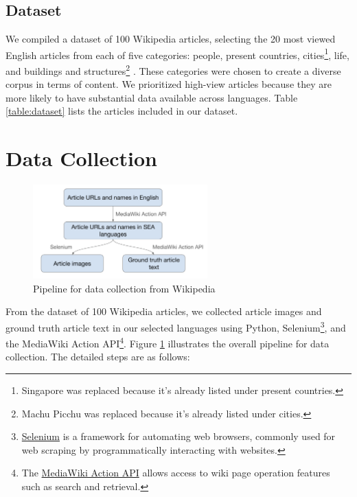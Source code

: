 \documentclass[12pt,oneside]{memoir}
\begin{document}
\subsection{Dataset}
We compiled a dataset of 100 Wikipedia articles, selecting the 20 most viewed English articles 
from each of five categories: people, present countries, cities\footnote{Singapore was replaced 
because it's already listed under present countries.}, life, and buildings and structures\footnote{Machu 
Picchu was replaced because it's already listed under cities.} 
\parencite{wikipedia-popular-pages-2024}.
These categories were chosen to create a diverse corpus in terms of content. 
We prioritized high-view articles because they are more likely to have substantial data available across languages. 
Table \ref{table:dataset} lists the articles included in our dataset.

\section{Data Collection}

\begin{figure}[ht]
    \centering
    \includegraphics[width=0.6\textwidth]{images/data-collection.png}
    \caption{Pipeline for data collection from Wikipedia}
    \label{figure:data-collection}
\end{figure}

From the dataset of 100 Wikipedia articles, we collected article images and ground 
truth article text in our selected languages using Python, 
Selenium\footnote{\href{https://selenium-python.readthedocs.io}{Selenium} is a 
framework for automating web browsers, commonly used for web scraping by programmatically 
interacting with websites.}, and the MediaWiki Action API\footnote{The \href{https://www.mediawiki.org/wiki/API:Main_page}{MediaWiki Action API} allows 
access to wiki page operation features such as search and retrieval.}. Figure \ref{figure:data-collection} illustrates the overall pipeline 
for data collection. The detailed steps are as follows:
\end{document}
